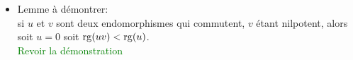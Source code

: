 \begin{itemize}
    \item Lemme à démontrer: \\
    si $u$ et $v$ sont deux endomorphismes qui commutent, $v$ étant nilpotent, alors soit $u=0$ soit $\mathrm{rg}(uv) < \mathrm{rg}(u)$.\\
    \textcolor{green}{Revoir la démonstration}
\end{itemize}